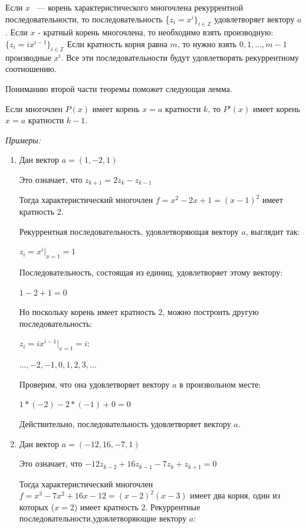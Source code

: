 \documentclass[russian]{lecture-notes}
\begin{document}
\begin{Theorem}
	Если $x$ ~--- корень характеристического многочлена рекуррентной последовательности, то последовательность \{$z_i=x^i\}_{i\in \mathbb{Z}}$ удовлетворяет вектору $a$. Если $x$ - кратный корень многочлена, то необходимо взять производную: $\{z_i=ix^{i-1}\}_{i\in \mathbb{Z}}$ Если кратность корня равна $m$, то нужно взять $0, 1, \ldots, m-1$ производные $x^i$. Все эти последовательности будут удовлетворять рекуррентному соотношению.
\end{Theorem}


 Пониманию второй части теоремы поможет следующая лемма.\\
\begin{Lemma}
	Если многочлен $P(x)$ имеет корень $x=a$ кратности $k$, то $P'(x)$ имеет корень $x=a$ кратности $k-1$.
\end{Lemma}



\emph{Примеры:}
\begin{enumerate}

\item Дан вектор $a=(1, -2, 1)$

 Это означает, что $z_{k+1}=2z_k-z_{k-1}$

 Тогда характеристический многочлен $f=x^2-2x+1=(x-1)^2$ имеет кратность 2.

 Рекуррентная последовательность, удовлетворяющая вектору $a$, выглядит так:

 $z_i=x^i|_{x=1}=1$

 Последовательность, состоящая из единиц, удовлетворяет этому вектору:

$1-2+1=0$

 Но поскольку корень имеет кратность 2, можно построить другую последовательность:

 $z_i=ix^{i-1}|_{x=1}=i:$

$..., -2, -1, 0, 1, 2, 3, \dots$

Проверим, что она удовлетворяет вектору $a$ в произвольном месте:

$1*(-2)-2*(-1)+0=0$

Действительно, последовательность удовлетворяет вектору $a$. \\

\item Дан вектор $a=(-12, 16, -7, 1)$

Это означает, что $-12z_{k-2}+16z_{k-1}-7z_{k}+z_{k+1}=0$

Тогда характеристический многочлен $f=x^3-7x^2+16x-12=(x-2)^2(x-3)$ имеет два корня, один из которых ($x=2$) имеет кратность 2.
Рекуррентные последовательности,удовлетворяющие вектору $a$:
\end{enumerate}
\end{document}
